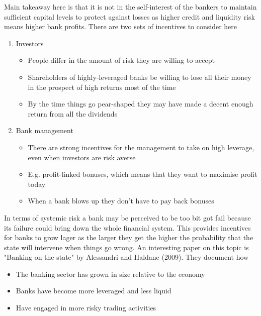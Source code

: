 \documentclass{beamer}
\begin{document}
\begin{frame}
  Main takeaway here is that it is not in the self-interest of the bankers to maintain sufficient capital levels to protect against losses as higher credit and liquidity risk means higher bank profits.
There are two sets of incentives to consider here
\begin{enumerate}
  \item Investors
  \begin{itemize}
    \item People differ in the amount of risk they are willing to accept
    \item Shareholders of highly-leveraged banks be willing to lose all their money in the prospect of high returns most of the time
    \item By the time things go pear-shaped they may have made a decent enough return from all the dividends
  \end{itemize}
  \item Bank management
  \begin{itemize}
    \item There are strong incentives for the management to take on high leverage, even when investors are risk averse
    \item E.g. profit-linked bonuses, which means that they want to maximise profit today
    \item When a bank blows up they don't have to pay back bonuses
  \end{itemize}
\end{enumerate}

\end{frame}

\begin{frame}
  In terms of systemic risk a bank may be perceived to be too bit got fail because its failure could bring down the whole financial system. 
This provides incentives for banks to grow lager as the larger they get the higher the probability that the state will intervene when things go wrong.
An interesting paper on this topic is "Banking on the state" by Alessandri and Haldane (2009). 
They document how
\begin{itemize}
  \item The banking sector has grown in size relative to the economy
  \item Banks have become more leveraged and less liquid
  \item Have engaged in more risky trading activities
\end{itemize}

\end{frame}
\end{document}
